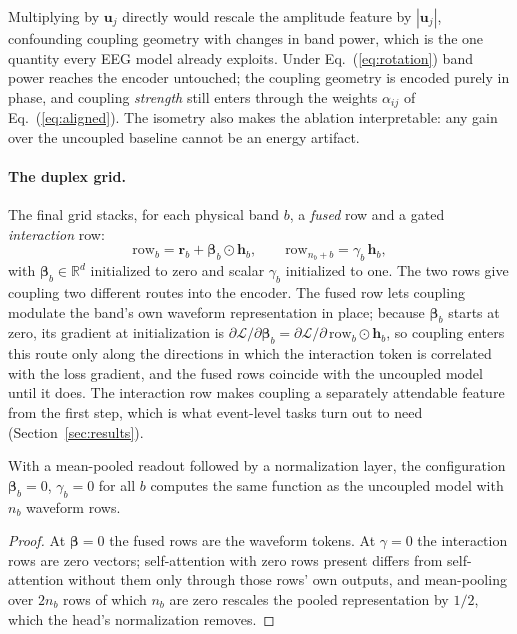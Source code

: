 Multiplying by $\mathbf{u}_j$ directly would rescale the amplitude feature
by $|\mathbf{u}_j|$, confounding coupling geometry with changes in band
power, which is the one quantity every EEG model already exploits. Under
Eq.~(\ref{eq:rotation}) band power reaches the encoder untouched; the
coupling geometry is encoded purely in phase, and coupling \emph{strength}
still enters through the weights $\alpha_{ij}$ of Eq.~(\ref{eq:aligned}).
The isometry also makes the ablation interpretable: any gain over the
uncoupled baseline cannot be an energy artifact.

\paragraph{The duplex grid.}
The final grid stacks, for each physical band $b$, a \emph{fused} row and
a gated \emph{interaction} row:
\begin{equation}
\text{row}_b = \mathbf{r}_b + \boldsymbol{\beta}_b \odot \mathbf{h}_b, \qquad
\text{row}_{n_b + b} = \gamma_b\, \mathbf{h}_b,
\label{eq:duplex}
\end{equation}
with $\boldsymbol{\beta}_b \in \mathbb{R}^d$ initialized to zero and scalar
$\gamma_b$ initialized to one. The two rows give coupling two different
routes into the encoder. The fused row lets coupling modulate the band's
own waveform representation in place; because $\boldsymbol{\beta}_b$
starts at zero, its gradient at initialization is
$\partial\mathcal{L}/\partial\boldsymbol{\beta}_b =
\partial\mathcal{L}/\partial\,\text{row}_b \odot \mathbf{h}_b$, so
coupling enters this route only along the directions in which the
interaction token is correlated with the loss gradient, and the fused rows
coincide with the uncoupled model until it does. The interaction row makes
coupling a separately attendable feature from the first step, which is what
event-level tasks turn out to need (Section~\ref{sec:results}).

\begin{proposition}
\label{prop:recover}
With a mean-pooled readout followed by a normalization layer, the
configuration $\boldsymbol{\beta}_b = 0$, $\gamma_b = 0$ for all $b$
computes the same function as the uncoupled model with $n_b$ waveform rows.
\end{proposition}
\begin{proof}
At $\boldsymbol{\beta} = 0$ the fused rows are the waveform tokens. At
$\gamma = 0$ the interaction rows are zero vectors; self-attention with
zero rows present differs from self-attention without them only through
those rows' own outputs, and mean-pooling over $2n_b$ rows of which $n_b$
are zero rescales the pooled representation by $1/2$, which the head's
normalization removes.
\end{proof}

